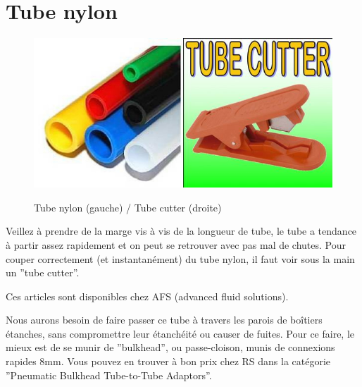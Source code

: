 \documentclass[a4paper, 11pt]{report}
\begin{document}
\section{Tube nylon}

\begin{figure}[h]
\caption{Tube nylon (gauche) / Tube cutter (droite)}

\centering{}\includegraphics[width=0.5\textwidth]{images/nylon_tubing.jpg}\includegraphics[width=0.5\textwidth]{images/tube_cutter.jpg}
\end{figure}

Veillez à prendre de la marge vis à vis de la longueur de tube, le
tube a tendance à partir assez rapidement et on peut se retrouver
avec pas mal de chutes. Pour couper correctement (et instantanément)
du tube nylon, il faut voir sous la main un ''tube cutter''.

Ces articles sont disponibles chez AFS (advanced fluid solutions).

Nous aurons besoin de faire passer ce tube à travers les parois de
boîtiers étanches, sans compromettre leur étanchéité ou causer de
fuites. Pour ce faire, le mieux est de se munir de ''bulkhead'',
ou passe-cloison, munis de connexions rapides 8mm. Vous pouvez en
trouver à bon prix chez RS dans la catégorie ''Pneumatic Bulkhead
Tube-to-Tube Adaptors''.
\end{document}
